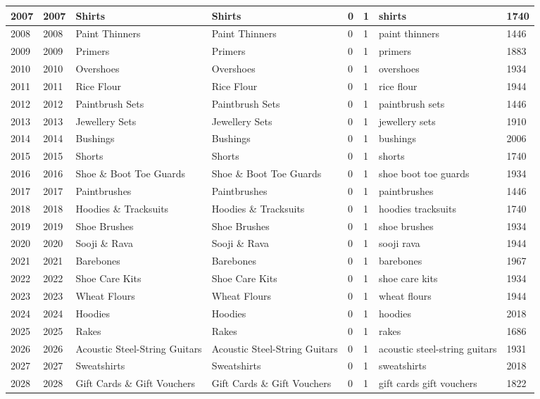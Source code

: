\begin{longtable}{|l|l|l|l|l|l|l|l|}
2007 & 2007 & Shirts & Shirts & 0 & 1 & shirts & 1740 \\ \hline 
2008 & 2008 & Paint Thinners & Paint Thinners & 0 & 1 & paint thinners & 1446 \\ \hline 
2009 & 2009 & Primers & Primers & 0 & 1 & primers & 1883 \\ \hline 
2010 & 2010 & Overshoes & Overshoes & 0 & 1 & overshoes & 1934 \\ \hline 
2011 & 2011 & Rice Flour & Rice Flour & 0 & 1 & rice flour & 1944 \\ \hline 
2012 & 2012 & Paintbrush Sets & Paintbrush Sets & 0 & 1 & paintbrush sets & 1446 \\ \hline 
2013 & 2013 & Jewellery Sets & Jewellery Sets & 0 & 1 & jewellery sets & 1910 \\ \hline 
2014 & 2014 & Bushings & Bushings & 0 & 1 & bushings & 2006 \\ \hline 
2015 & 2015 & Shorts & Shorts & 0 & 1 & shorts & 1740 \\ \hline 
2016 & 2016 & Shoe \& Boot Toe Guards & Shoe \& Boot Toe Guards & 0 & 1 & shoe boot toe guards & 1934 \\ \hline 
2017 & 2017 & Paintbrushes & Paintbrushes & 0 & 1 & paintbrushes & 1446 \\ \hline 
2018 & 2018 & Hoodies \& Tracksuits & Hoodies \& Tracksuits & 0 & 1 & hoodies tracksuits & 1740 \\ \hline 
2019 & 2019 & Shoe Brushes & Shoe Brushes & 0 & 1 & shoe brushes & 1934 \\ \hline 
2020 & 2020 & Sooji \& Rava & Sooji \& Rava & 0 & 1 & sooji rava & 1944 \\ \hline 
2021 & 2021 & Barebones & Barebones & 0 & 1 & barebones & 1967 \\ \hline 
2022 & 2022 & Shoe Care Kits & Shoe Care Kits & 0 & 1 & shoe care kits & 1934 \\ \hline 
2023 & 2023 & Wheat Flours & Wheat Flours & 0 & 1 & wheat flours & 1944 \\ \hline 
2024 & 2024 & Hoodies & Hoodies & 0 & 1 & hoodies & 2018 \\ \hline 
2025 & 2025 & Rakes & Rakes & 0 & 1 & rakes & 1686 \\ \hline 
2026 & 2026 & Acoustic Steel-String Guitars & Acoustic Steel-String Guitars & 0 & 1 & acoustic steel-string guitars & 1931 \\ \hline 
2027 & 2027 & Sweatshirts & Sweatshirts & 0 & 1 & sweatshirts & 2018 \\ \hline 
2028 & 2028 & Gift Cards \& Gift Vouchers & Gift Cards \& Gift Vouchers & 0 & 1 & gift cards gift vouchers & 1822 \\ \hline 

\end{longtable}
